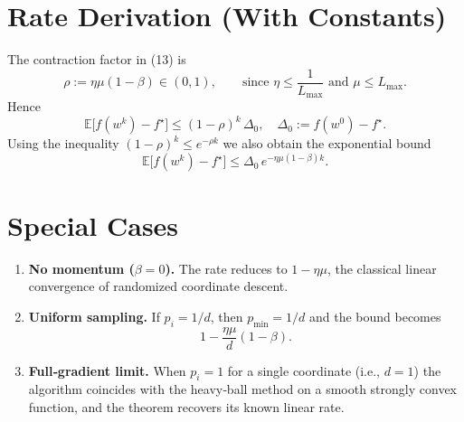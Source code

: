 \documentclass[11pt]{article}
\newcommand{\E}{\mathbb{E}}
\begin{document}
\section*{Rate Derivation (With Constants)}
The contraction factor in (13) is
\[
\rho:=\eta\mu(1-\beta)\in(0,1),
\qquad\text{since }\eta\le\frac{1}{L_{\max}}\text{ and }\mu\le L_{\max}.
\]
Hence
\[
\E\!\bigl[f(w^{k})-f^{\star}\bigr]\le (1-\rho)^{k}\,\Delta_{0},
\quad\Delta_{0}:=f(w^{0})-f^{\star}.
\]
Using the inequality $(1-\rho)^{k}\le e^{-\rho k}$ we also obtain the exponential bound
\[
\E\!\bigl[f(w^{k})-f^{\star}\bigr]\le \Delta_{0}\,e^{-\eta\mu(1-\beta)k}.
\]

\section*{Special Cases}
\begin{enumerate}
\item \textbf{No momentum ($\beta=0$).}  
The rate reduces to $1-\eta\mu$, the classical linear convergence of randomized coordinate descent.
\item \textbf{Uniform sampling.}  
If $p_i=1/d$, then $p_{\min}=1/d$ and the bound becomes 
\[
1-\frac{\eta\mu}{d}(1-\beta).
\]
\item \textbf{Full‑gradient limit.}  
When $p_i=1$ for a single coordinate (i.e., $d=1$) the algorithm coincides with the heavy‑ball method on a smooth strongly convex function, and the theorem recovers its known linear rate.
\end{enumerate}

\end{document}
